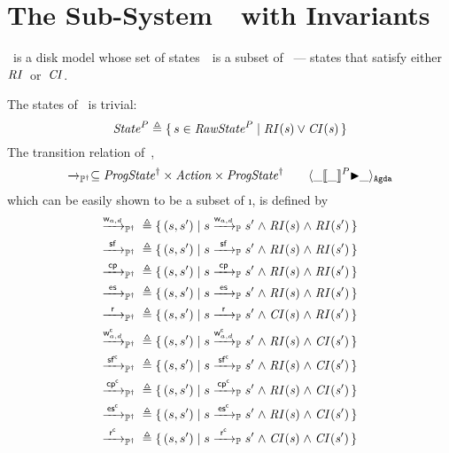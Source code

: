 
\section{The Sub-System~\ProgInv\ with Invariants}
\label{sec:ProgInv}
\ProgInv\ is a disk model whose set of states~\AgdaId{\ProgInvState}\ is a subset of \ProgState\ --- states that satisfy either $\mathit{RI}$~or~$\mathit{CI}$.

The states of \ProgInv\ is trivial:
$$\mathit{State}^P {}\triangleq{}{} \{\, s \in \mathit{RawState}^P \mid \mathit{RI(s) \lor CI(s)} \,\}$$
The transition relation of~\ProgInv,
$$\xrightarrow{}_{\mathbb P^\dagger} \subseteq \mathit{ProgState^\dagger} \times \mathit{Action} \times \mathit{ProgState^\dagger} \qquad \langle \_[\kern-1.5pt[\_]\kern-1.5pt]^P{\blacktriangleright}\_ \rangle_\mathtt{Agda} $$
which can be easily shown to be a subset of \i{\ttP{}}, is defined by
\begin{alignat*}{3}
	\ttPI{\awa{w}{\actw_{a, d}}} \defeq{}& \{\, (s, s') \mid s \ttP{\awa{w}{\actw_{a, d}}} s' \conj \i{RI(s)} \conj \i{RI(s')} \,\} \\
	\ttPI{\awa{w}\actf} \defeq{}& \{\, (s, s') \mid s \ttP{\awa{w}\actf} s' \conj \i{RI(s)} \conj \i{RI(s')} \,\} \\
    \ttPI{\awa{w}\actcp} \defeq{}& \{\, (s, s') \mid s \ttP{\awa{w}\actcp} s' \conj \i{RI(s)} \conj \i{RI(s')} \,\} \\
    \ttPI{\awa{w}\actes} \defeq{}& \{\, (s, s') \mid s \ttP{\awa{w}\actes} s' \conj \i{RI(s)} \conj \i{RI(s')} \,\} \\
	\ttPI{\awa{w}\actr} \defeq{}& \{\, (s, s') \mid s \ttP{\awa{w}\actr} s' \conj \i{CI(s)} \conj \i{RI(s')} \,\} \\
	\ttPI{\awa{w}{\actwc_{a, d}}} \defeq{}& \{\, (s, s') \mid s \ttP{\awa{w}{\actwc_{a, d}}} s' \conj \i{RI(s)} \conj \i{CI(s')} \,\} \\
	\ttPI{\awa{w}\actfc} \defeq{}& \{\, (s, s') \mid s \ttP{\awa{w}\actfc} s' \conj \i{RI(s)} \conj \i{CI(s')} \,\} \\
	\ttPI{\awa{w}\actcpc} \defeq{}& \{\, (s, s') \mid s \ttP{\awa{w}\actcpc} s' \conj \i{RI(s)} \conj \i{CI(s')} \,\} \\
	\ttPI{\awa{w}\actesc} \defeq{}& \{\, (s, s') \mid s \ttP{\awa{w}\actesc} s' \conj \i{RI(s)} \conj \i{CI(s')} \,\} \\
	\ttPI{\awa{w}\actrc} \defeq{}& \{\, (s, s') \mid s \ttP{\awa{w}\actrc} s' \conj \i{CI(s)} \conj \i{CI(s')} \,\} 
\end{alignat*}

